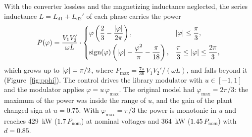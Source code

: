 \documentclass[12pt,a4paper]{scrartcl}
\newcommand{\ped}[1]{_{\mathrm{#1}}}
\begin{document}
\begin{onehalfspace}
With the converter lossless and the magnetizing inductance neglected, the series inductance $L = L\ped{d1} + L\ped{d2}'$ of each phase carries the power \cite{dedoncker1991}
\begin{equation}
	P(\varphi) = \frac{V\ped{1} V\ped{2}'}{\omega L} \cdot
	\begin{cases}
		\varphi\left(\dfrac{2}{3} - \dfrac{\abs{\varphi}}{2\pi}\right), & \abs{\varphi} \le \dfrac{\pi}{3},\\[3mm]
		\sign(\varphi)\left(\abs{\varphi} - \dfrac{\varphi^2}{\pi} - \dfrac{\pi}{18}\right), & \dfrac{\pi}{3} \le \abs{\varphi} \le \dfrac{2\pi}{3},
	\end{cases}
	\label{eq:power}
\end{equation}
which grows up to $\abs{\varphi} = \pi/2$, where $P\ped{max} = \frac{7\pi}{36}\,V\ped{1} V\ped{2}'/(\omega L)$, and falls beyond it (Figure~\ref{fig:pphi}). The control drives the library modulator with $u \in [-1, 1]$ and the modulator applies $\varphi = u\,\varphi\ped{max}$. The original model had $\varphi\ped{max} = 2\pi/3$: the maximum of the power was inside the range of $u$, and the gain of the plant changed sign at $u = 0.75$. With $\varphi\ped{max} = \pi/3$ the power is monotonic in $u$ and reaches \SI{429}{\kilo\watt} ($1.7\,P\ped{nom}$) at nominal voltages and \SI{364}{\kilo\watt} ($1.45\,P\ped{nom}$) with $d = 0.85$.


\end{onehalfspace}
\end{document}

